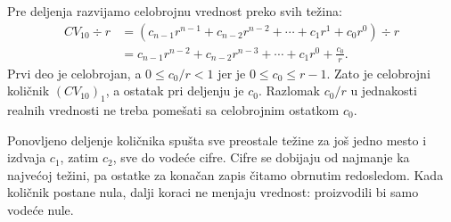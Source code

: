 
Pre deljenja razvijamo celobrojnu vrednost preko svih težina:
\[\begin{aligned}
CV_{10}\div r
&=(c_{n-1}r^{n-1}+c_{n-2}r^{n-2}+\cdots+c_1r^1+c_0r^0)\div r\\
&=c_{n-1}r^{n-2}+c_{n-2}r^{n-3}+\cdots+c_1r^0+\frac{c_0}{r}.
\end{aligned}\]
Prvi deo je celobrojan, a $0\leq c_0/r<1$ jer je $0\leq c_0\leq r-1$. Zato je celobrojni količnik $(CV_{10})_1$, a ostatak pri deljenju je $c_0$. Razlomak $c_0/r$ u jednakosti realnih vrednosti ne treba pomešati sa celobrojnim ostatkom $c_0$.

Ponovljeno deljenje količnika spušta sve preostale težine za još jedno mesto i izdvaja $c_1$, zatim $c_2$, sve do vodeće cifre. Cifre se dobijaju od najmanje ka najvećoj težini, pa ostatke za konačan zapis čitamo obrnutim redosledom. Kada količnik postane nula, dalji koraci ne menjaju vrednost: proizvodili bi samo vodeće nule.
